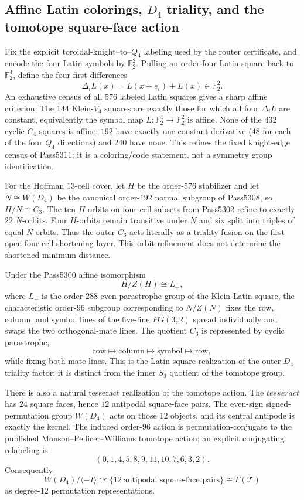 \subsection{Affine Latin colorings, $D_4$ triality, and the tomotope square-face action}

Fix the explicit toroidal-knight--to--$Q_4$ labeling used by the router
certificate, and encode the four Latin symbols by $\mathbb F_2^2$.  Pulling an
order-four Latin square back to $\mathbb F_2^4$, define the four first
differences
\[
  \Delta_iL(x)=L(x+e_i)+L(x)\in\mathbb F_2^2.
\]
An exhaustive census of all $576$ labeled Latin squares gives a sharp affine
criterion.  The $144$ Klein-$V_4$ squares are exactly those for which all four
$\Delta_iL$ are constant, equivalently the symbol map
$L:\mathbb F_2^4\to\mathbb F_2^2$ is affine.  None of the $432$ cyclic-$C_4$
squares is affine: $192$ have exactly one constant derivative ($48$ for each
of the four $Q_4$ directions) and $240$ have none.  This refines the fixed
knight-edge census of Pass5311; it is a coloring/code statement, not a symmetry
group identification.

For the Hoffman $13$-cell cover, let $H$ be the order-$576$ stabilizer and let
$N\cong W(D_4)$ be the canonical order-$192$ normal subgroup of Pass5308, so
$H/N\cong C_3$.  The ten $H$-orbits on four-cell subsets from Pass5302 refine
to exactly $22$ $N$-orbits.  Four $H$-orbits remain transitive under $N$ and
six split into triples of equal $N$-orbits.  Thus the outer $C_3$ acts literally
as a triality fusion on the first open four-cell shortening layer.  This orbit
refinement does not determine the shortened minimum distance.

Under the Pass5300 affine isomorphism
\[
  H/Z(H)\cong L_+,
\]
where $L_+$ is the order-$288$ even-parastrophe group of the Klein Latin
square, the characteristic order-$96$ subgroup corresponding to $N/Z(N)$
fixes the row, column, and symbol lines of the five-line $PG(3,2)$ spread
individually and swaps the two orthogonal-mate lines.  The quotient $C_3$ is
represented by cyclic parastrophe,
\[
  \mathrm{row}\longmapsto\mathrm{column}\longmapsto\mathrm{symbol}
  \longmapsto\mathrm{row},
\]
while fixing both mate lines.  This is the Latin-square realization of the
outer $D_4$ triality factor; it is distinct from the inner $S_3$ quotient of
the tomotope group.

There is also a natural tesseract realization of the tomotope action.  The
$tesseract$ has $24$ square faces, hence $12$ antipodal square-face pairs.
The even-sign signed-permutation group $W(D_4)$ acts on those $12$ objects,
and its central antipode is exactly the kernel.  The induced order-$96$ action
is permutation-conjugate to the published Monson--Pellicer--Williams
tomotope action; an explicit conjugating relabeling is
\[
  (0,1,4,5,8,9,11,10,7,6,3,2).
\]
Consequently
\[
  W(D_4)/\langle -I\rangle\curvearrowright
  \{12\ \text{antipodal square-face pairs}\}
  \cong \Gamma(\mathcal T)
\]
as degree-$12$ permutation representations.

